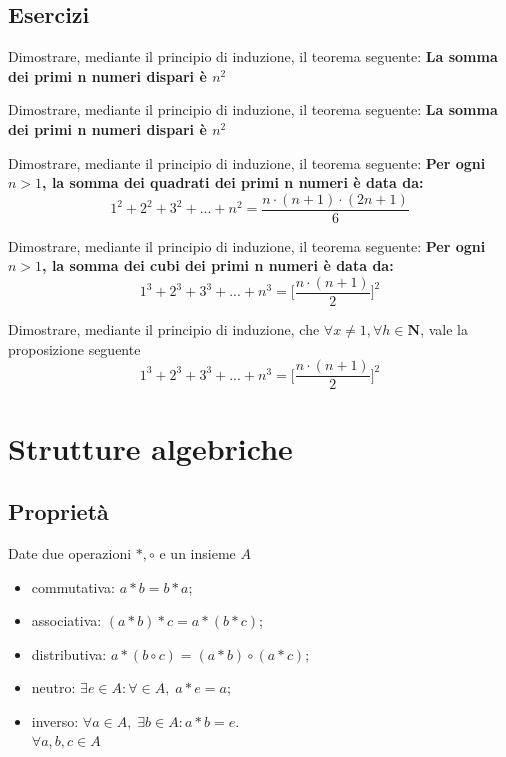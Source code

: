 \begin{flushleft}
\subsection{Esercizi}
\begin{esercizio}
Dimostrare, mediante il principio di induzione, il teorema seguente:
\textbf{La somma dei primi n numeri dispari è $n^2$}
\end{esercizio}
\vspace{200px}

\begin{esercizio}
Dimostrare, mediante il principio di induzione, il teorema seguente:
\textbf{La somma dei primi n numeri dispari è $n^2$}
\end{esercizio}
\vspace{200px}

\begin{esercizio}
Dimostrare, mediante il principio di induzione, il teorema seguente:
\textbf{Per ogni $n>1$, la somma dei quadrati dei primi n numeri è data da:}
\[1^2 + 2^2 + 3^2+...+n^2 = \frac{n\cdot (n+1)\cdot (2n+1)}{6}\]
\end{esercizio}
\vspace{200px}


\begin{esercizio}
Dimostrare, mediante il principio di induzione, il teorema seguente:
\textbf{Per ogni $n>1$, la somma dei cubi dei primi n numeri è data da:}
\[1^3 + 2^3 + 3^3+...+n^3 = \Big[\frac{n\cdot(n+1)}{2}\Big]^2\]
\end{esercizio}
\vspace{200px}


\begin{esercizio}
Dimostrare, mediante il principio di induzione, che $\forall x\neq 1, \forall h \in \mathbf{N}$, vale la proposizione seguente
\[1^3 + 2^3 + 3^3+...+n^3 = \Big[\frac{n\cdot(n+1)}{2}\Big]^2\]
\end{esercizio}
\vspace{200px}

\section{Strutture algebriche}
\subsection{Proprietà}
Date due operazioni $\ast, \circ$ e un insieme $A$
\begin{itemize}
    \item commutativa: $a\ast b = b\ast a$;
    \item associativa: $(a\ast b) \ast c = a\ast (b \ast c)$;
    \item distributiva: $a\ast (b\circ c) = (a \ast b) \circ (a\ast c)$;
    \item neutro: $\exists e \in A: \forall \in A,\;a\ast e = a$;
    \item inverso: $\forall a \in A,\;\exists b \in A: a\ast b = e$.\\
    $\forall a, b, c \in A$
\end{itemize}

\end{flushleft}
